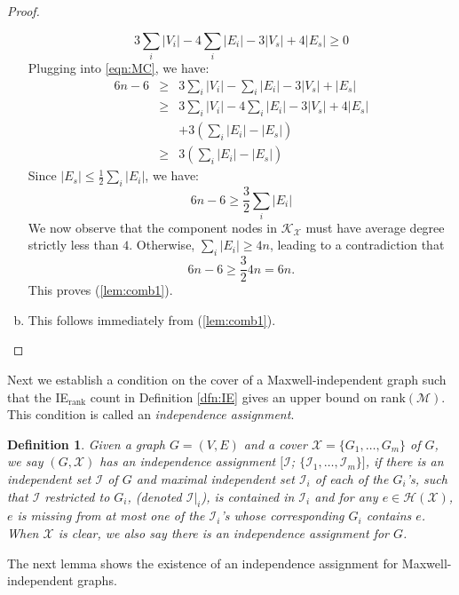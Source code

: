 \documentclass[10pt]{article}
\def\M{\mathcal {M}}
\def\I{\mathcal {I}}
\def\H{\mathcal {H}}
\def\X{\mathcal {X}}
\def\K{\mathscr{K}}
\newtheorem{dfn}{Definition}
\begin{document}
\begin{proof}
\begin{enumerate}[(a)]
\begin{equation*}
3\sum\limits_{i} |V_i| -4 \sum\limits_{i} |E_i| -3|V_s|+ 4|E_s| \geq 0
\end{equation*}
Plugging into \eqref{eqn:MC}, we have:
\begin{eqnarray*}
6n - 6 &\geq& 3\sum\limits_{i} |V_i| -\sum_{i} |E_i| -3|V_s|+|E_s|\\
&\geq &3\sum\limits_{i} |V_i| -4 \sum_{i} |E_i| -3|V_s|+ 4|E_s|\\
&& + 3( \sum\limits_{i} |E_i| -|E_s|)\\
&\geq&3( \sum\limits_{i} |E_i| -|E_s|)
\end{eqnarray*}
Since $|E_s| \leq \frac{1}{2}\sum\limits_{i} |E_i|$, we have:
\begin{equation*}
6n - 6 \geq \frac{3}{2} \sum\limits_{i} |E_i|
\end{equation*}
We now observe that the component nodes in $\K_{\X}$ must have average degree strictly less than $4$. Otherwise, $\sum_{i} |E_i| \geq 4n$, leading to a contradiction that
\begin{equation*}
6n - 6 \geq \frac{3}{2} 4n = 6n.
\end{equation*}
This proves (\ref{lem:comb1}).

\item This follows immediately from (\ref{lem:comb1}).

\end{enumerate}


\end{proof}

Next we establish a condition on the cover of a Maxwell-independent graph such that the IE$_\text{rank}$ count in Definition \ref{dfn:IE} gives an upper bound on rank$(\M)$. This condition is called an {\em independence assignment}.

\begin{dfn}\label{dfn:assign}
Given a graph $G=(V, E)$ and a cover $\X=\{G_1, \ldots, G_m\}$ of $G$, we say $(G, \X)$ has an {\em independence assignment} $[\I$; $\{\I_1, \ldots,\I_m\}]$, if there is an independent set $\I$ of $G$ and maximal independent set
$\I_i$ of each of the $G_i$'s, such that $\I$ {\em restricted to} $G_i$, (denoted $\I|_i$), is contained in $\I_i$ and for any $e\in \H(\X)$, $e$
is missing from at most one of the $\I_i$'s whose corresponding $G_i$ contains $e$. When $\X$ is clear, we also say there is an independence assignment for $G$. \end{dfn}


\medskip
\noindent
The next lemma shows the existence of an independence assignment for Maxwell-independent graphs.
\end{document}
